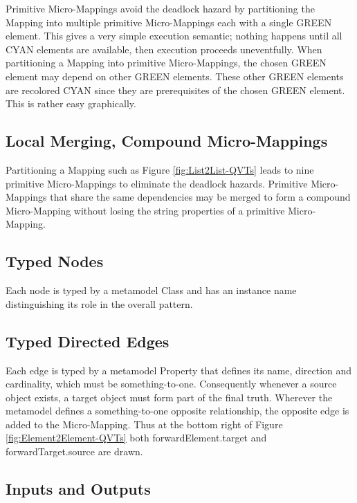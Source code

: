 \documentclass[conference]{IEEEtran}
\begin{document}
Primitive Micro-Mappings avoid the deadlock hazard by partitioning the Mapping into multiple primitive Micro-Mappings each with a single GREEN element. This gives a very simple execution semantic; nothing happens until all CYAN elements are available, then execution proceeds uneventfully. When partitioning a Mapping into primitive Micro-Mappings, the chosen GREEN element may depend on other GREEN elements. These other GREEN elements are recolored CYAN since they are prerequisites of the chosen GREEN element. This is rather easy graphically.  

\subsection{Local Merging, Compound Micro-Mappings}\label{Local Merging}\label{Compound Micro-Mapping}

Partitioning a Mapping such as Figure \ref{fig:List2List-QVTs} leads to nine primitive Micro-Mappings to eliminate the deadlock hazards. Primitive Micro-Mappings that share the same dependencies may be merged to form a compound Micro-Mapping without losing the string properties of a primitive Micro-Mapping.

\subsection{Typed Nodes}

Each node is typed by a metamodel Class and has an instance name distinguishing its role in the overall pattern. 

\subsection{Typed Directed Edges}

Each edge is typed by a metamodel Property that defines its name, direction and cardinality, which must be something-to-one. Consequently whenever a source object exists, a target object must form part of the final truth.
Wherever the metamodel defines a something-to-one opposite relationship, the opposite edge is added to the Micro-Mapping. Thus at the bottom right of Figure \ref{fig:Element2Element-QVTs} both forwardElement.target and forwardTarget.source are drawn.%

\subsection{Inputs and Outputs}
\end{document}
